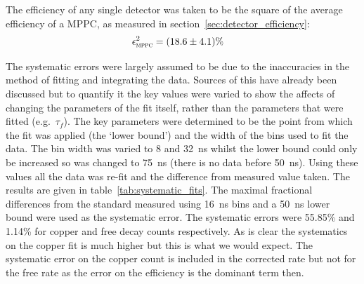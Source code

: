 The efficiency of any single detector was taken to be the square of the average efficiency of a MPPC, as measured in section~\ref{sec:detector_efficiency}:
\begin{align}
  \epsilon_{\textsc{mppc}}^2 &= (18.6 \pm 4.1)\% 
\end{align}

The systematic errors were largely assumed to be due to the inaccuracies in the method of fitting and integrating the data. Sources of this have already been discussed but to quantify it the key values were varied to show the affects of changing the parameters of the fit itself, rather than the parameters that were fitted (e.g.\ \(\tau_f\)). The key parameters were determined to be the point from which the fit was applied (the `lower bound') and the width of the bins used to fit the data. The bin width was varied to 8 and 32~ns whilst the lower bound could only be increased so was changed to 75~ns (there is no data before 50~ns). Using these values all the data was re-fit and the difference from measured value taken. The results are given in table~\ref{tab:systematic_fits}. The maximal fractional differences from the standard measured using 16~ns bins and a 50~ns lower bound were used as the systematic error. The systematic errors were 55.85\% and 1.14\% for copper and free decay counts respectively. As is clear the systematics on the copper fit is much higher but this is what we would expect. The systematic error on the copper count is included in the corrected rate but not for the free rate as the error on the efficiency is the dominant term then.

